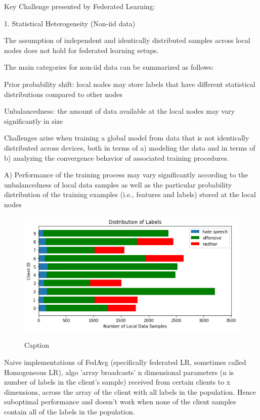 \documentclass[letterpaper]{article} %
\begin{document}
Key Challenge presented by Federated Learning:

1.	Statistical Heterogeneity (Non-iid data)

The assumption of independent and identically distributed samples across local nodes does not hold for federated learning setups.

The main categories for non-iid data can be summarized as follows:

Prior probability shift: local nodes may store labels that have different statistical distributions compared to other nodes

Unbalancedness: the amount of data available at the local nodes may vary significantly in size

Challenges arise when training a global model from data that is not identically distributed across devices, both in terms of a) modeling the data and in terms of b) analyzing the convergence behavior of associated training procedures.

A)  Performance of the training process may vary significantly according to the unbalancedness of local data samples as well as the particular probability distribution of the training examples (i.e., features and labels) stored at the local nodes

\begin{figure}[h]
{\includegraphics[width=\columnwidth]{noniid-distribution-based-label-imbalance_distribution_of_labels_2}}
\caption{Caption}
\end{figure}

Naive implementations of FedAvg (specifically federated LR, sometimes called Homogeneous LR), algo 'array broadcasts' n dimensional parameters (n is number of labels in the client's sample) received from certain clients to x dimensions, across the array of the client with all labels in the population. Hence suboptimal performance and doesn't work when none of the client samples contain all of the labels in the population.
\end{document}

